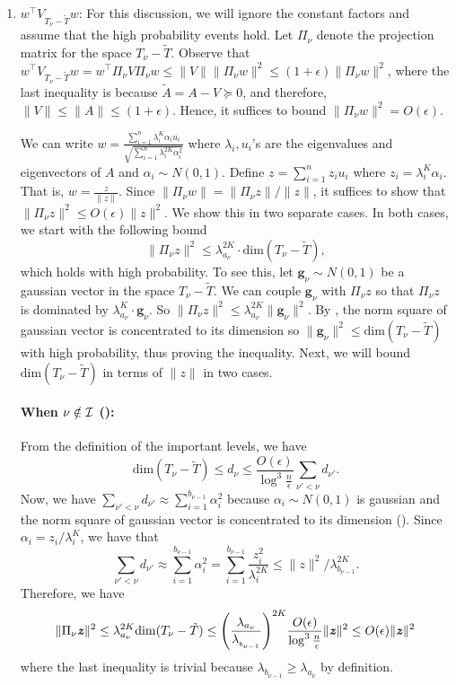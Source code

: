 \documentclass[11pt]{article}
\let\originalleft\left
\let\originalright\right
\renewcommand{\left}{\mathopen{}\mathclose\bgroup\originalleft}
\renewcommand{\right}{\aftergroup\egroup\originalright}
\def\dim#1{\mathrm{dim} (#1)}
\newcommand\uu{\boldsymbol{\mathit{u}}}
\newcommand\ww{\boldsymbol{\mathit{w}}}
\newcommand\zz{\boldsymbol{\mathit{z}}}
\renewcommand\AA{\boldsymbol{\mathit{A}}}
\newcommand\VV{\boldsymbol{\mathit{V}}}
\newcommand\Ttil{{\tilde{\mathit{T}}}}
\newcommand\AAtil{\boldsymbol{\widetilde{\mathit{A}}}}
\begin{document}
\begin{enumerate}
    \item $\ww^{\top}\VV_{T_{\nu} -\tilde{T}}\ww$: For this discussion, we will ignore the constant factors and assume that the high probability events hold. Let $\Pi_{\nu}$ denote the projection matrix for the space $T_{\nu}-\Ttil$. Observe that $\ww^{\top}\VV_{T_{\nu}-\Ttil}\ww=\ww^{\top}\Pi_{\nu}\VV\Pi_{\nu}\ww\le\|\VV\|\|\Pi_{\nu}\ww\|^2 \le (1+\epsilon)\|\Pi_{\nu}\ww\|^2$, where the last inequality is because $\AAtil=\AA-\VV\succeq0$, and therefore, $\|\VV\|\le\|\AA\|\le(1+\epsilon)$. Hence, it suffices to bound $\|\Pi_{\nu}\ww\|^2 = O(\epsilon)$. 

We can write $\ensuremath{\ww=\frac{\sum_{i=1}^{n}\lambda_{i}^{K}\alpha_{i}\uu_{i}}{\sqrt{\sum_{i=1}^{n}\lambda_{i}^{2K}\alpha_{i}^{2}}}}$ where $\lambda_{i},\uu_{i}$'s are the eigenvalues and eigenvectors of $\AA$ and $\alpha_{i}\sim N(0,1)$. 
Define $\zz = \sum_{i=1}^n z_i \uu_i$ where $z_i = \lambda_i^K\alpha_i$. That is, 
$\ww=\frac{\zz}{\|\zz\|}$. Since $\|\Pi_{\nu}\ww\| = \|\Pi_{\nu}\zz\|/\|\zz\|$, it suffices to show that $\|\Pi_{\nu}\zz\|^2 \le O(\epsilon) \| \zz\|^2$. We show this in two separate cases. In both cases, we start with the following bound
\[
\|\Pi_{\nu}\zz\|^{2}\le\lambda_{a_{\nu}}^{2K}\cdot\dim{T_{\nu}-\tilde{T}},
\]
which holds with high probability. To see this, let $\boldsymbol{g}_{\nu}\sim N(0,1)$ be a gaussian vector in the space $T_{\nu}-\tilde{T}$. 
We can couple $\textbf{g}_\nu$ with $\Pi_{\nu}\zz$ so that $\Pi_{\nu}\zz$ is dominated by $\lambda_{a_{\nu}}^{K}\cdot \boldsymbol{g}_{\nu}$. So $\|\Pi_{\nu}\zz\|^{2}\le\lambda_{a_{\nu}}^{2K}\|\boldsymbol{g}_{\nu}\|^{2}$. By , the norm square of gaussian vector is concentrated to its dimension so $\|\boldsymbol{g}_{\nu}\|^{2}\le\dim{T_{\nu}-\tilde{T}}$ with high probability, thus proving the inequality. Next, we will bound $\dim{T_{\nu}-\tilde{T}}$ in terms of $\|\zz\|$ in two cases. 

\paragraph{When $\nu\protect\notin{\cal I}$ ():}

From the definition of the important levels, we have 
\[
\dim{T_{\nu}-\tilde{T}}\leq d_{\nu}\leq\frac{O(\epsilon)}{\log^{3}\frac{n}{\epsilon}}\sum_{\nu'<\nu}d_{\nu'}.
\]
Now, we have $\sum_{\nu'<\nu}d_{\nu'}\approx\sum_{i=1}^{b_{\nu-1}}\alpha_{i}^{2}$ because $\alpha_{i}\sim N(0,1)$ is gaussian and the norm square of gaussian vector is concentrated to its dimension (). Since $\alpha_{i}=z_{i}/\lambda_{i}^{K}$, we have that
\[
\sum_{\nu'<\nu}d_{\nu'}\approx\sum_{i=1}^{b_{\nu-1}}\alpha_{i}^{2}=\sum_{i=1}^{b_{\nu-1}}\frac{z_{i}^{2}}{\lambda_{i}^{2K}}\le\|\zz\|^{2}/\lambda_{b_{\nu-1}}^{2K}.
\]
Therefore, we have 
\[
\|\Pi_{\nu}\zz\|^2 \le\lambda_{a_{\nu}}^{2K}\dim{T_{\nu}-\tilde{T}}\le\left(\frac{\lambda_{a_{\nu}}}{\lambda_{_{b_{\nu-1}}}}\right)^{2K}\frac{O(\epsilon)}{\log^{3}\frac{n}{\epsilon}}\|\zz\|^{2}\le O(\epsilon)\|\zz\|^{2}
\]
where the last inequality is trivial because $\lambda_{b_{\nu-1}}\ge\lambda_{a_{\nu}}$ by definition.


\end{enumerate}
\end{document}
